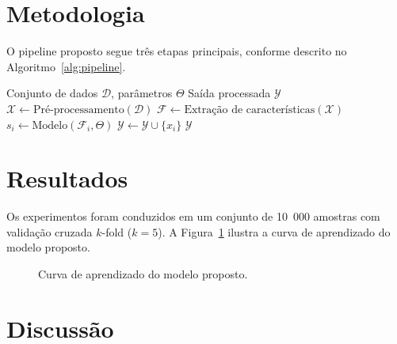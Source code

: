 \documentclass[12pt,a4paper]{article}
\theoremstyle{plain}
\theoremstyle{definition}
\theoremstyle{remark}
\begin{document}
\section{Metodologia}
\label{sec:metod}

O pipeline proposto segue tr\^es etapas principais, conforme descrito
no Algoritmo~\ref{alg:pipeline}.

\begin{algorithm}[htbp]
\caption{Pipeline de processamento}
\label{alg:pipeline}
\begin{algorithmic}[1]
\Require Conjunto de dados $\mathcal{D}$, par\^ametros $\Theta$
\Ensure Sa\'ida processada $\mathcal{Y}$
\State $\mathcal{X} \gets \text{Pr\'e-processamento}(\mathcal{D})$
\State $\mathcal{F} \gets \text{Extra\c{c}\~ao de caracter\'isticas}(\mathcal{X})$
    \State $s_i \gets \text{Modelo}(\mathcal{F}_i, \Theta)$
        \State $\mathcal{Y} \gets \mathcal{Y} \cup \{x_i\}$
    \EndIf
\EndFor
\State \Return $\mathcal{Y}$
\end{algorithmic}
\end{algorithm}

\section{Resultados}
\label{sec:result}

Os experimentos foram conduzidos em um conjunto de 10~000 amostras
com valida\c{c}\~ao cruzada $k$-fold ($k=5$). A Figura~\ref{fig:curva}
ilustra a curva de aprendizado do modelo proposto.

\begin{figure}[htbp]
\centering
\vspace{3cm}
\begin{minipage}{0.7\textwidth}
\centering
{}
\end{minipage}
\caption{Curva de aprendizado do modelo proposto.}
\label{fig:curva}
\end{figure}

\section{Discuss\~ao}
\label{sec:disc}
\end{document}
